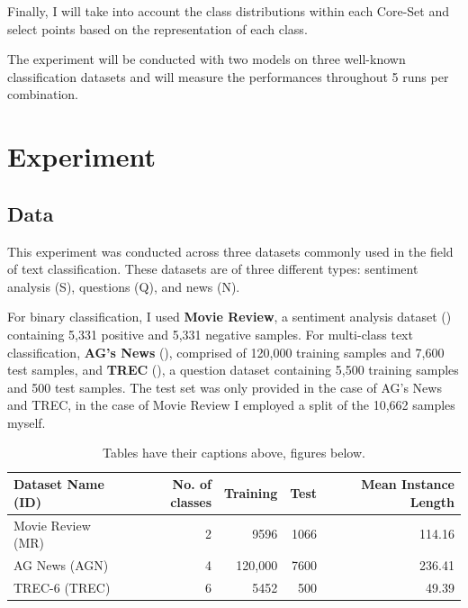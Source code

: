 \documentclass[english,bachelor,ul]{webisthesis} %
\begin{document}
Finally, I will take into account the class distributions within each Core-Set and select points based on the representation of each class.

The experiment will be conducted with two models on three well-known classification datasets and will measure the performances throughout 5 runs per combination. 

\chapter{Experiment}

\section{Data}

This experiment was conducted across three datasets commonly used in the field of text classification. These datasets are of three different types: sentiment analysis (S), questions (Q), and news (N). 

For binary classification, I used \textbf{Movie Review}, a sentiment analysis dataset (\cite{DBLP:conf/acl/PangL05}) containing 5,331 positive and 5,331 negative samples. For multi-class text classification, \textbf{AG's News} (\cite{DBLP:conf/nips/ZhangZL15}), comprised of 120,000 training samples and 7,600 test samples, and \textbf{TREC} (\cite{DBLP:journals/nle/LiR06}), a question dataset containing 5,500 training samples and 500 test samples. The test set was only provided in the case of AG's News and TREC, in the case of Movie Review I employed a split of the 10,662 samples myself.

\begin{table}[p]%
  \caption{Tables have their captions above, figures below.}
  \label{table-with-numbers}%
  \centering\small
  \begin{tabular}{@{}lrrrr@{}} %
    \toprule
      \bfseries Dataset Name (ID) & \bfseries No. of classes & \bfseries Training & \bfseries Test & \bfseries Mean Instance Length \\
    \midrule
      Movie Review (MR) & 2 & 9596 & 1066 & 114.16 \\
      AG News (AGN) & 4 & 120,000 & 7600 &  236.41 \\
      TREC-6 (TREC) & 6 & 5452 & 500 & 49.39 \\
    \bottomrule
  \end{tabular}
\end{table}
\end{document}
